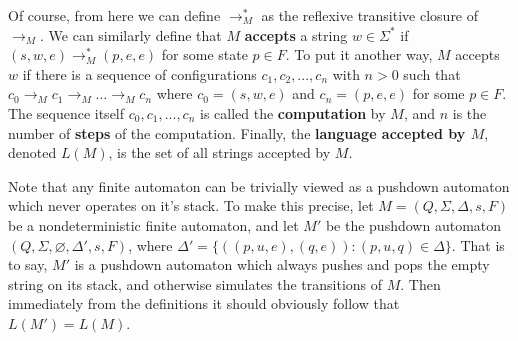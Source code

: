 \documentclass{article}
\theoremstyle{definition}
\theoremstyle{plain}
\theoremstyle{theorem}
\begin{document}
Of course, from here we can define $\to^*_M$ as the reflexive transitive closure of $\to_M$. We can similarly define that $M$ \textbf{accepts} a string $w \in \Sigma^*$ if $(s,w,e) \to^*_M (p,e,e)$ for some state $p \in F$. To put it another way, $M$ accepts $w$ if there is a sequence of configurations $c_1,c_2,...,c_n$ with $n > 0$ such that $c_0 \to_M c_1 \to_M \ldots \to_M c_n$ where $c_0 = (s,w,e)$ and $c_n = (p,e,e)$ for some $p \in F$. The sequence itself $c_0,c_1,...,c_n$ is called the \textbf{computation} by $M$, and $n$ is the number of \textbf{steps} of the computation. Finally, the \textbf{language accepted by $M$}, denoted $L(M)$, is the set of all strings accepted by $M$. \par 
Note that any finite automaton can be trivially viewed as a pushdown automaton which never operates on it's stack. To make this precise, let $M = (Q,\Sigma,\Delta,s,F)$ be a nondeterministic finite automaton, and let $M'$ be the pushdown automaton $(Q,\Sigma,\varnothing,\Delta',s,F)$, where $\Delta' = \{((p,u,e),(q,e)): (p,u,q) \in \Delta\}$. That is to say, $M'$ is a pushdown automaton which always pushes and pops the empty string on its stack, and otherwise simulates the transitions of $M$. Then immediately from the definitions it should obviously follow that $L(M') = L(M)$. 
\end{document}

